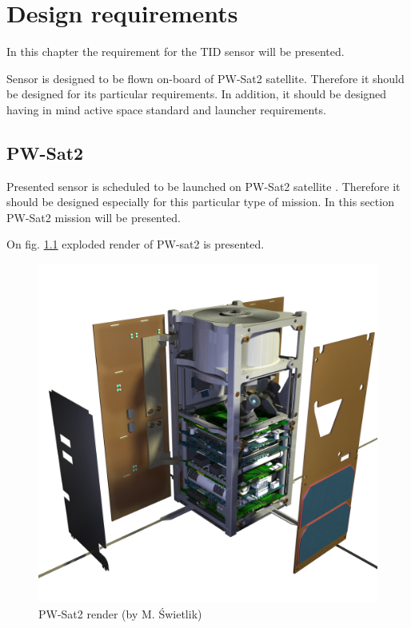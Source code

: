 \chapter{Design requirements}

In this chapter the requirement for the TID sensor will be presented.

Sensor is designed to be flown on-board of PW-Sat2 satellite. Therefore it should be designed for its particular requirements. In addition, it should be designed having in mind active space standard and launcher requirements.


\section{PW-Sat2}
    Presented sensor is scheduled to be launched on PW-Sat2 satellite \cite{PW-Sat2URL}. Therefore it should be designed especially for this particular type of mission. In this section PW-Sat2 mission will be presented. 

    On fig. \ref{PW-Sat_render_01} exploded render of PW-sat2 is presented.

    \begin{figure}[h]
        \centering
        \includegraphics[width=0.5\paperwidth]{img/PW-Sat2_render_01.png}
        \caption{PW-Sat2 render (by M. Świetlik)}
        \label{PW-Sat_render_01}
    \end{figure}

